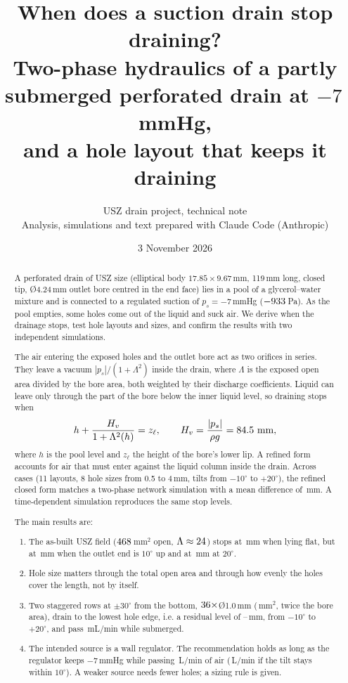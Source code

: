 \documentclass[10pt,a4paper]{article}
\title{\textbf{When does a suction drain stop draining?}\\[3pt]
\large Two-phase hydraulics of a partly submerged perforated drain at $-7$\,mmHg,\\
and a hole layout that keeps it draining}
\author{USZ drain project, technical note\\[2pt]
\small Analysis, simulations and text prepared with Claude Code (Anthropic)}
\date{3 November 2026}
\newcommand{\zl}{z_\ell}
\begin{document}
\maketitle

\begin{abstract}
\noindent
A perforated drain of USZ size (elliptical body $17.85\times9.67$\,mm, 119\,mm long, closed tip, \O4.24\,mm outlet bore centred in the end face) lies in a pool of a glycerol--water mixture and is connected to a regulated suction of $p_s=-7$\,mmHg ($-933$\,Pa). As the pool empties, some holes come out of the liquid and suck air. We derive when the drainage stops, test hole layouts and sizes, and confirm the results with two independent simulations.

The air entering the exposed holes and the outlet bore act as two orifices in series. They leave a vacuum $|p_s|/(1+\Lambda^2)$ inside the drain, where $\Lambda$ is the exposed open area divided by the bore area, both weighted by their discharge coefficients. Liquid can leave only through the part of the bore below the inner liquid level, so draining stops when
\[
h + \frac{H_v}{1+\Lambda^2(h)} = \zl, \qquad H_v=\frac{|p_s|}{\rho g}=\numHv\ \text{mm},
\]
where $h$ is the pool level and $\zl$ the height of the bore's lower lip. A refined form accounts for air that must enter against the liquid column inside the drain. Across \numnSweep{} cases (11 layouts, 8 hole sizes from 0.5 to 4\,mm, tilts from $-10^\circ$ to $+20^\circ$), the refined closed form matches a two-phase network simulation with a mean difference of \numerrMean\,mm. A time-dependent simulation reproduces the same stop levels.

The main results are:
\begin{enumerate}[label=(\roman*)]
\item The as-built USZ field ($468$\,mm$^2$ open, $\Lambda\approx24$) stops at \numuszZero\,mm when lying flat, but at \numuszTen\,mm when the outlet end is $10^\circ$ up and at \numuszTwenty\,mm at $20^\circ$.
\item Hole size matters through the total open area and through how evenly the holes cover the length, not by itself.
\item Two staggered rows at $\pm30^\circ$ from the bottom, $36\times$\O1.0\,mm (\numrecArea\,mm$^2$, twice the bore area), drain to the lowest hole edge, i.e. a residual level of \numrecHmin--\numrecHmax\,mm, from $-10^\circ$ to $+20^\circ$, and pass \numrecQ\,mL/min while submerged.
\item The intended source is a wall regulator. The recommendation holds as long as the regulator keeps $-7$\,mmHg while passing \numcapTwenty\,L/min of air (\numcapTen\,L/min if the tilt stays within $10^\circ$). A weaker source needs fewer holes; a sizing rule is given.
\end{enumerate}
\end{abstract}
\end{document}
